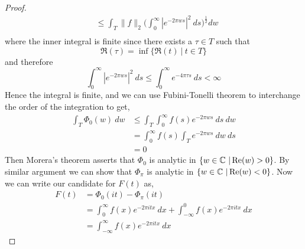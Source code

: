 \begin{proof}
\begin{align*}
    & \le \int_T \|f\|_2 \Bigg( \int_0^\infty \left|e^{-2\pi w s}\right|^2 \ ds \Bigg)^\frac{1}{2} dw \\
  \end{align*}
  where the inner integral is finite since there exists a $\tau \in T$ such that $$\Re(\tau) = \inf\{ \Re(t) \ | \ t \in T \}$$
  and therefore $$\int_0^\infty \left|e^{-2 \pi ws} \right|^2 \ ds \le \int_0^\infty e^{-4 \pi \tau s} \ ds < \infty$$
Hence the integral is finite, and we can use Fubini-Tonelli theorem to interchange the order of the integration to get,
  \begin{align*}
    \int_T \Phi_0(w) \ dw & \le \int_T \int_0^\infty f(s)e^{-2\pi w s} \ ds \ dw \\
    & = \int_0^\infty f(s) \int_T e^{-2\pi w s} \ dw \ ds \\
    & = 0
  \end{align*}
  Then Morera's theorem asserts that $\Phi_0$ is analytic in $\{w \in \mathbb C \ | \operatorname{Re}(w) > 0 \}$. By similar argument we can show that $\Phi_\pi$ is analytic in $\{w \in \mathbb C \ | \operatorname{Re}(w) < 0 \}$. Now we can write our candidate for $F(t)$ as, \begin{align*} F(t) &= \Phi_0(it) - \Phi_\pi(it) \\
    & = \int_0^\infty f(x)e^{-2\pi it x} \ dx + \int^0_{-\infty} f(x) e^{-2\pi it x} \ dx \\
    &= \int_{-\infty}^\infty f(x) e^{-2\pi it x} \ dx
  \end{align*}


\end{proof}
